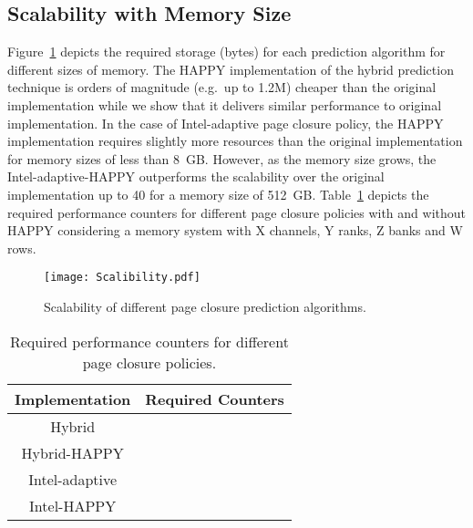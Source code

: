 \subsection{Scalability with Memory Size}



Figure~\ref{fig:Scalability_graph} depicts the required storage (bytes) for each prediction algorithm for different sizes of memory. The HAPPY implementation of the hybrid prediction technique is orders of magnitude (e.g.\ up to 1.2M) cheaper than the original implementation while we show that it delivers similar performance to original implementation. In the case of Intel-adaptive page closure policy, the HAPPY implementation requires slightly more resources than the original implementation for memory sizes of less than 8~GB. However, as the memory size grows, the Intel-adaptive-HAPPY outperforms the scalability over the original implementation up to 40 for a memory size of 512~GB. Table~\ref{table:Required_Counters_For_Each_Scheme} depicts the required performance counters for different page closure policies with and without HAPPY considering a memory system with X channels, Y ranks, Z banks and W rows.

\begin{figure}[!htb]
\centering
\texttt{[image: Scalibility.pdf]}
\caption{Scalability of different page closure prediction algorithms.}
\label{fig:Scalability_graph}
\end{figure}



\begin{table}[!htb]
\small
\centering
  \begin{tabular}{| c | c |}
	\hline
	\textbf{Implementation} & \textbf{Required Counters} \\
	\hline
	Hybrid &  \\
	\hline	
	Hybrid-HAPPY &  \\
	\hline
	Intel-adaptive &  \\
	\hline
	Intel-HAPPY &  \\
	\hline		
  \end{tabular}
  \caption{Required performance counters for different page closure policies.}
  \label{table:Required_Counters_For_Each_Scheme}
\end{table}














